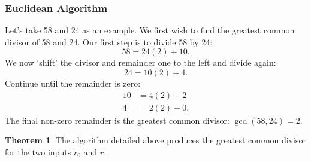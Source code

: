\documentclass[]{scrartcl}
\theoremstyle{definition}
\newtheorem{thm}{Theorem}
\begin{document}
\subsubsection{Euclidean Algorithm}
Let's take 58 and 24 as an example. We first wish to find the greatest common divisor of 58 and 24. Our first step is to divide 58 by 24:
\[
    58 = 24(2) + 10.
\]
We now `shift' the divisor and remainder one to the left and divide again:
\[
    24 = 10(2) + 4.
\]
Continue until the remainder is zero:
\begin{align*}
    10 &= 4(2) + 2 \\
    4 &= 2(2) + 0.
\end{align*}
The final non-zero remainder is the greatest common divisor: $\gcd(58,24) = 2$.
\begin{thm}
    The algorithm detailed above produces the greatest common divisor for the two inputs $r_0$ and $r_1$.
\end{thm}
\end{document}
